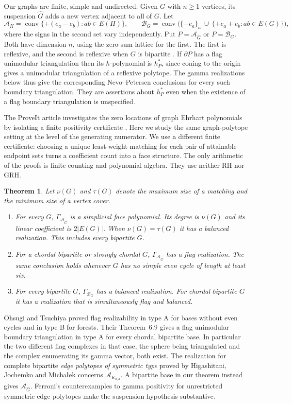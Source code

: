 \documentclass[11pt]{article}
\newtheorem{theorem}{Theorem}[section]
\newcommand{\G}{\Gamma}
\newcommand{\A}{\mathcal A}
\newcommand{\B}{\mathcal B}
\DeclareMathOperator{\conv}{conv}
\begin{document}
Our graphs are finite, simple and undirected. Given $G$ with $n\ge1$ vertices, its suspension $\widehat G$ adds a new vertex adjacent to all of $G$. Let
\[
 \A_H=\conv\{\pm(e_a-e_b):ab\in E(H)\},\qquad
 \B_G=\conv\bigl(\{\pm e_a\}_a\ \cup\ \{\pm e_a\pm e_b:ab\in E(G)\}\bigr),
\]
where the signs in the second set vary independently. Put $P=\A_{\widehat G}$ or $P=\B_G$. Both have dimension $n$, using the zero-sum lattice for the first. The first is reflexive, and the second is reflexive when $G$ is bipartite \cite{OT}. If $\partial P$ has a flag unimodular triangulation then its $h$-polynomial is $h^*_P$, since coning to the origin gives a unimodular triangulation of a reflexive polytope. The gamma realizations below thus give the corresponding Nevo--Petersen conclusions for every such boundary triangulation. They are assertions about $h^*_P$ even when the existence of a flag boundary triangulation is unspecified.

The ProveIt article investigates the zero locations of graph Ehrhart polynomials by isolating a finite positivity certificate \cite{repo}. Here we study the same graph-polytope setting at the level of the generating numerator. We use a different finite certificate: choosing a unique least-weight matching for each pair of attainable endpoint sets turns a coefficient count into a face structure. The only arithmetic of the proofs is finite counting and polynomial algebra. They use neither RH nor GRH.

\begin{theorem}\label{main}
Let $\nu(G)$ and $\tau(G)$ denote the maximum size of a matching and the minimum size of a vertex cover.
\begin{enumerate}
\item For every $G$, $\G_{\A_{\widehat G}}$ is a simplicial face polynomial. Its degree is $\nu(G)$ and its linear coefficient is $2|E(G)|$. When $\nu(G)=\tau(G)$ it has a balanced realization. This includes every bipartite $G$.
\item For a chordal bipartite or strongly chordal $G$, $\G_{\A_{\widehat G}}$ has a flag realization. The same conclusion holds whenever $G$ has no simple even cycle of length at least six.
\item For every bipartite $G$, $\G_{\B_G}$ has a balanced realization. For chordal bipartite $G$ it has a realization that is simultaneously flag and balanced.
\end{enumerate}
\end{theorem}
Ohsugi and Tsuchiya \cite[Thms.~1.3 and 7.5]{OT} proved flag realizability in type A for bases without even cycles and in type B for forests. Their Theorem~6.9 gives a flag unimodular boundary triangulation in type A for every chordal bipartite base. In particular the two different flag complexes in that case, the sphere being triangulated and the complex enumerating its gamma vector, both exist. The realization for complete bipartite \emph{edge polytopes of symmetric type} proved by Higashitani, Jochemko and Micha\l ek \cite{HJM} concerns $\A_{K_{a,b}}$. A bipartite base in our theorem instead gives $\A_{\widehat{G}}$.
Ferroni's counterexamples to gamma positivity for unrestricted symmetric edge polytopes \cite{Fer} make the suspension hypothesis substantive.
\end{document}
